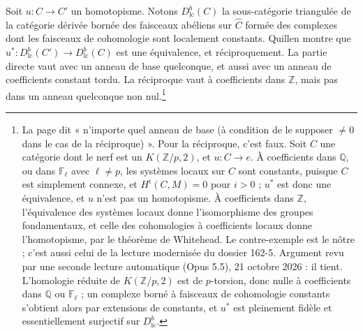 \documentclass[11pt,a4paper]{article}
\begin{document}
Soit $u : C \to C'$ un homotopisme. Notons $D^{b}_{\mathrm{lc}}(C)$ la
sous-catégorie triangulée de la catégorie dérivée bornée des faisceaux abéliens
sur $\widehat{C}$ formée des complexes dont les faisceaux de cohomologie sont
localement constants. Quillen montre que $u^{*} : D^{b}_{\mathrm{lc}}(C') \to
D^{b}_{\mathrm{lc}}(C)$ est une équivalence, et réciproquement. La partie
directe vaut avec un anneau de base quelconque, et aussi avec un anneau de
coefficients constant tordu. La réciproque vaut à coefficients dans
$\mathbb{Z}$, mais pas dans un anneau quelconque non nul.\footnote{La page dit
« n'importe quel anneau de base (à condition de le supposer $\neq 0$ dans le
cas de la réciproque) ». Pour la réciproque, c'est faux. Soit $C$ une catégorie
dont le nerf est un $K(\mathbb{Z}/p, 2)$, et $u : C \to e$. À coefficients dans
$\mathbb{Q}$, ou dans $\mathbb{F}_{\ell}$ avec $\ell \neq p$, les systèmes
locaux sur $C$ sont constants, puisque $C$ est simplement connexe, et
$H^{i}(C, M) = 0$ pour $i > 0$ ; $u^{*}$ est donc une équivalence, et $u$
n'est pas un homotopisme. À coefficients dans $\mathbb{Z}$, l'équivalence des
systèmes locaux donne l'isomorphisme des groupes fondamentaux, et celle des
cohomologies à coefficients locaux donne l'homotopisme, par le théorème de
Whitehead. Le contre-exemple est le nôtre ; c'est aussi celui de la lecture modernisée du dossier 162-5. Argument revu par une seconde lecture automatique (Opus 5.5), 21 octobre 2026 : il tient. L'homologie réduite de $K(\mathbb{Z}/p, 2)$ est de $p$-torsion, donc nulle à coefficients dans $\mathbb{Q}$ ou $\mathbb{F}_{\ell}$ ; un complexe borné à faisceaux de cohomologie constants s'obtient alors par extensions de constants, et $u^{*}$ est pleinement fidèle et essentiellement surjectif sur $D^{b}_{\mathrm{lc}}$.}
\end{document}
